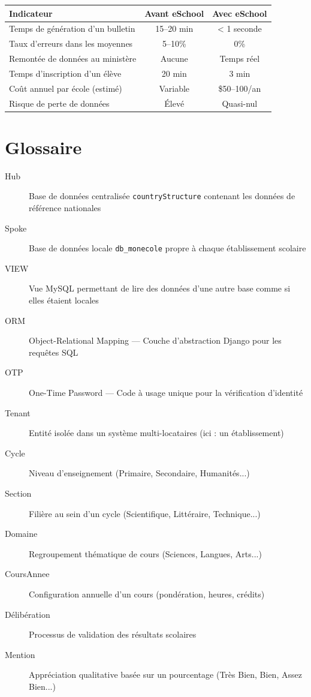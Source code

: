 \documentclass[12pt,a4paper,oneside]{report}
\begin{document}
\begin{center}
\begin{tabularx}{\textwidth}{X c c}
\toprule
\textbf{Indicateur} & \textbf{Avant eSchool} & \textbf{Avec eSchool} \\
\midrule
Temps de génération d'un bulletin & 15--20 min & < 1 seconde \\
Taux d'erreurs dans les moyennes & 5--10\% & 0\% \\
Remontée de données au ministère & Aucune & Temps réel \\
Temps d'inscription d'un élève & 20 min & 3 min \\
Coût annuel par école (estimé) & Variable & \$50--100/an \\
Risque de perte de données & Élevé & Quasi-nul \\
\bottomrule
\end{tabularx}
\end{center}

\appendix
\chapter{Glossaire}

\begin{description}
  \item[Hub] Base de données centralisée \texttt{countryStructure} contenant les données de référence nationales
  \item[Spoke] Base de données locale \texttt{db\_monecole} propre à chaque établissement scolaire
  \item[VIEW] Vue MySQL permettant de lire des données d'une autre base comme si elles étaient locales
  \item[ORM] Object-Relational Mapping — Couche d'abstraction Django pour les requêtes SQL
  \item[OTP] One-Time Password — Code à usage unique pour la vérification d'identité
  \item[Tenant] Entité isolée dans un système multi-locataires (ici : un établissement)
  \item[Cycle] Niveau d'enseignement (Primaire, Secondaire, Humanités...)
  \item[Section] Filière au sein d'un cycle (Scientifique, Littéraire, Technique...)
  \item[Domaine] Regroupement thématique de cours (Sciences, Langues, Arts...)
  \item[CoursAnnee] Configuration annuelle d'un cours (pondération, heures, crédits)
  \item[Délibération] Processus de validation des résultats scolaires
  \item[Mention] Appréciation qualitative basée sur un pourcentage (Très Bien, Bien, Assez Bien...)
\end{description}
\end{document}
